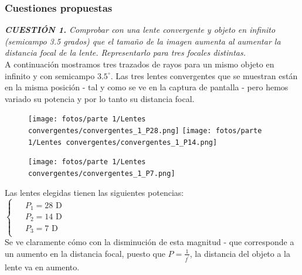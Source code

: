 \documentclass[11pt]{article}
\begin{document}
    \clearpage
    \subsubsection{Cuestiones propuestas}
    \textit{\textbf{CUESTIÓN 1.} Comprobar con una lente convergente y objeto en infinito (semicampo 3.5 grados) que el tamaño de la imagen aumenta al aumentar la distancia focal de la lente. Representarlo para tres focales distintas.}
    \\
    
    \noindent
    A continuación mostramos tres trazados de rayos para un mismo objeto en infinito y con semicampo $3.5^\circ$. Las tres lentes convergentes que se muestran están en la misma posición - tal y como se ve en la captura de pantalla - pero hemos variado su potencia y por lo tanto su distancia focal.\\
    
    \begin{figure}[ht]
        \centering
        \texttt{[image: fotos/parte 1/Lentes convergentes/convergentes\_1\_P28.png]}
        \texttt{[image: fotos/parte 1/Lentes convergentes/convergentes\_1\_P14.png]}
    \end{figure}
        
   \begin{figure}
        \vspace{-0.6cm}
        \centering
        \texttt{[image: fotos/parte 1/Lentes convergentes/convergentes\_1\_P7.png]}
    \end{figure} 
    
    \noindent Las lentes elegidas tienen las siguientes potencias:\\

    $\begin{cases}
        \begin{aligned}
            &P_1 = 28\text{ D}\\
            &P_2 = 14\text{ D}\\
            &P_3 = 7\text{ D}
        \end{aligned}
    \end{cases}$\\

    \vspace{0.25cm}
    Se ve claramente cómo con la disminución de esta magnitud - que corresponde a un aumento en la distancia focal, puesto que $P = \frac{1}{f^\prime}$, la distancia del objeto a la lente va en aumento.
    
\end{document}
